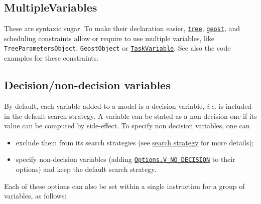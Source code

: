
\subsection{MultipleVariables}\label{model:multiplevariables}\hypertarget{model:multiplevariables}{}
These are syntaxic sugar. To make their declaration easier, \hyperlink{tree:treeconstraint}{\tt tree}, \hyperlink{geost:geostconstraint}{\tt geost}, and scheduling constraints allow or require to use multiple variables, like \texttt{TreeParametersObject}, \texttt{GeostObject} or \hyperlink{taskvariable}{\tt TaskVariable}.
See also the code examples for these constraints.


\subsection{Decision/non-decision variables}\label{model:decisionvariables}\hypertarget{model:decisionvariables}{}

By default, each variable added to a model is a decision variable, \textit{i.e.} is included in the default search strategy. A variable can be stated as a non decision one if its value can be computed by side-effect. To specify non decision variables, one can 
\begin{itemize}
\item exclude them from its search strategies (see \hyperlink{solver:searchstrategy}{search strategy} for more details);
\item specify non-decision variables (adding \hyperlink{vnodecision:vnodecisionoptions}{\tt Options.V\_NO\_DECISION} to their options) and keep the default search strategy.
\end{itemize}

Each of these options can also be set within a single instruction for a group of variables, as follows: 


